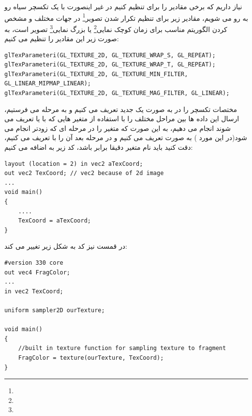 \documentclass[a4paper, 12pt]{report}
\newcommand{\lrit}[1]{\lr{\textit{#1}}}
\begin{document}
    نیاز داریم که برخی مقادیر را برای  تنظیم کنیم در غیر اینصورت با یک تکسچر سیاه رو به رو می شویم، مقادیر زیر برای تنظیم تکرار شدن تصویر\footnote{} در جهات مختلف و مشخص کردن الگوریتم مناسب برای زمان کوچک نمایی\footnote{} یا بزرگ نمایی\footnote{} تصویر است، به صورت زیر این مقادیر را تنظیم می کنیم:

    \begin{LTR}
    \small
        \begin{lstlisting}[style=C++Style,caption=\lrit{set minimum setting for a texture}]
glTexParameteri(GL_TEXTURE_2D, GL_TEXTURE_WRAP_S, GL_REPEAT);	
glTexParameteri(GL_TEXTURE_2D, GL_TEXTURE_WRAP_T, GL_REPEAT);
glTexParameteri(GL_TEXTURE_2D, GL_TEXTURE_MIN_FILTER, GL_LINEAR_MIPMAP_LINEAR);
glTexParameteri(GL_TEXTURE_2D, GL_TEXTURE_MAG_FILTER, GL_LINEAR);
        \end{lstlisting}
    \end{LTR}
    \normalsize
    \vspace*{0.3cm}

    مختصات تکسچر را در  به صورت یک  جدید تعریف می کنیم و به مرحله  می فرستیم، ارسال این داده ها بین مراحل مختلف  را با استفاده از متغیر هایی که با  یا تعریف می شوند انجام می دهیم، به این صورت که متغیر را در مرحله ای که زودتر انجام می شود(در این مورد ) به صورت  تعریف می کنیم و در مرحله بعد آن را با  تعریف می کنیم، دقت کنید باید نام متغیر دقیقا برابر باشد، کد زیر به  اضافه می کنیم:

       \begin{LTR}
    \small
        \begin{lstlisting}[style=C++Style,caption=\lrit{vertex shader to use texture}]
layout (location = 2) in vec2 aTexCoord;
out vec2 TexCoord; // vec2 because of 2d image
...
void main()
{
    ....
    TexCoord = aTexCoord;
}
        \end{lstlisting}
    \end{LTR}
    \normalsize
    \vspace*{0.3cm}

    در قمست  نیز کد به شکل زیر تغییر می کند:

    \begin{LTR}
    \small
        \begin{lstlisting}[style=C++Style,caption=\lrit{fragment shader to use texture}]
#version 330 core
out vec4 FragColor;
...
in vec2 TexCoord;

uniform sampler2D ourTexture;

void main()
{
    //built in texture function for sampling texture to fragment
    FragColor = texture(ourTexture, TexCoord);
}
        \end{lstlisting}
    \end{LTR}
    \normalsize
    \vspace*{0.3cm}
\end{document}
